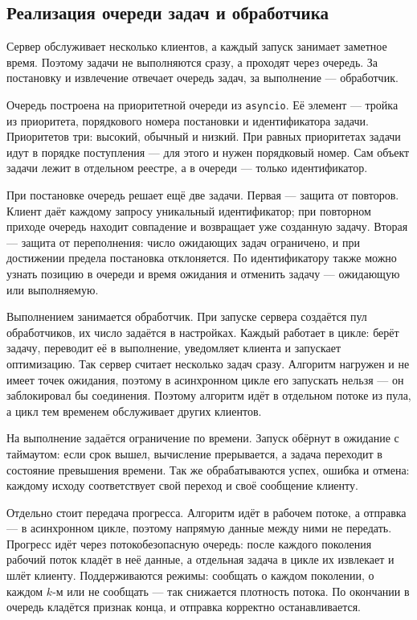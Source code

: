 \documentclass[14pt, a4paper]{extarticle}
\begin{document}
\subsection{Реализация очереди задач и обработчика}
\label{subsec:queue}

Сервер обслуживает несколько клиентов, а каждый запуск занимает заметное время.
Поэтому задачи не выполняются сразу, а проходят через очередь. За постановку и
извлечение отвечает очередь задач, за выполнение --- обработчик.

Очередь построена на приоритетной очереди из \texttt{asyncio}. Её элемент --- тройка
из приоритета, порядкового номера постановки и идентификатора задачи. Приоритетов
три: высокий, обычный и низкий. При равных приоритетах задачи идут в порядке
поступления --- для этого и нужен порядковый номер. Сам объект задачи лежит в
отдельном реестре, а в очереди --- только идентификатор.

При постановке очередь решает ещё две задачи. Первая --- защита от повторов. Клиент
даёт каждому запросу уникальный идентификатор; при повторном приходе очередь
находит совпадение и возвращает уже созданную задачу. Вторая --- защита от
переполнения: число ожидающих задач ограничено, и при достижении предела постановка
отклоняется. По идентификатору также можно узнать позицию в очереди и время
ожидания и отменить задачу --- ожидающую или выполняемую.

Выполнением занимается обработчик. При запуске сервера создаётся пул обработчиков,
их число задаётся в настройках. Каждый работает в цикле: берёт задачу, переводит её
в выполнение, уведомляет клиента и запускает оптимизацию. Так сервер считает
несколько задач сразу. Алгоритм нагружен и не имеет точек ожидания, поэтому в
асинхронном цикле его запускать нельзя --- он заблокировал бы соединения. Поэтому
алгоритм идёт в отдельном потоке из пула, а цикл тем временем обслуживает других
клиентов.

На выполнение задаётся ограничение по времени. Запуск обёрнут в ожидание с
таймаутом: если срок вышел, вычисление прерывается, а задача переходит в состояние
превышения времени. Так же обрабатываются успех, ошибка и отмена: каждому исходу
соответствует свой переход и своё сообщение клиенту.

Отдельно стоит передача прогресса. Алгоритм идёт в рабочем потоке, а отправка ---
в асинхронном цикле, поэтому напрямую данные между ними не передать. Прогресс идёт
через потокобезопасную очередь: после каждого поколения рабочий поток кладёт в неё
данные, а отдельная задача в цикле их извлекает и шлёт клиенту. Поддерживаются
режимы: сообщать о каждом поколении, о каждом $k$-м или не сообщать --- так
снижается плотность потока. По окончании в очередь кладётся признак конца, и
отправка корректно останавливается.
\end{document}
